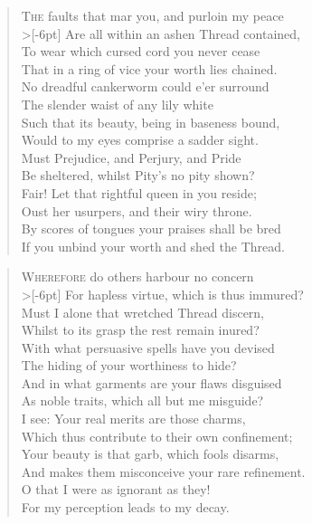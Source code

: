 \documentclass[a5paper, 12pt, oneside]{memoir}
\begin{document}
\PoemTitle{}
\begin{verse}
    \lettrine{T}{he} faults that mar you, and purloin my peace \\>[-6pt]
    Are all within an ashen Thread contained, \\
    To wear which cursed cord you never cease \\
    That in a ring of vice your worth lies chained. \\
    No dreadful cankerworm could e'er surround \\
    The slender waist of any lily white \\
    Such that its beauty, being in baseness bound, \\
    Would to my eyes comprise a sadder sight. \\
    Must Prejudice, and Perjury, and Pride \\
    Be sheltered, whilst Pity's no pity shown? \\
    Fair! Let that rightful queen in you reside; \\
    Oust her usurpers, and their wiry throne. \\
    \vin By scores of tongues your praises shall be bred \\
    \vin If you unbind your worth and shed the Thread.
\end{verse}

\PoemTitle{}
\begin{verse}
    \lettrine{W}{herefore} do others harbour no concern \\>[-6pt]
    For hapless virtue, which is thus immured? \\
    Must I alone that wretched Thread discern, \\
    Whilst to its grasp the rest remain inured? \\
    With what persuasive spells have you devised \\
    The hiding of your worthiness to hide? \\
    And in what garments are your flaws disguised \\
    As noble traits, which all but me misguide? \\
    I see: Your real merits are those charms, \\
    Which thus contribute to their own confinement; \\
    Your beauty is that garb, which fools disarms, \\
    And makes them misconceive your rare refinement. \\
    \vin O that I were as ignorant as they! \\
    \vin For my perception leads to my decay.
\end{verse}
\end{document}
